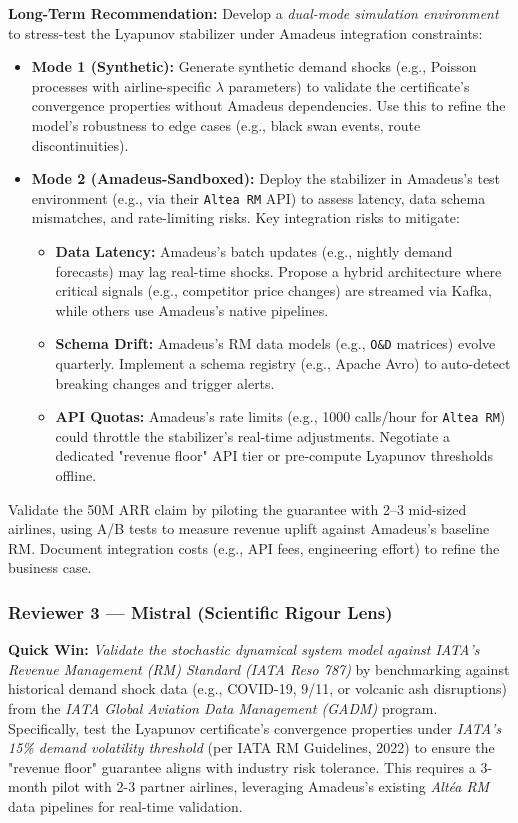 \documentclass[11pt,a4paper]{article}
\begin{document}
\textbf{Long-Term Recommendation:}
Develop a \textit{dual-mode simulation environment} to stress-test the Lyapunov stabilizer under Amadeus integration constraints:
\begin{itemize}
    \item \textbf{Mode 1 (Synthetic):} Generate synthetic demand shocks (e.g., Poisson processes with airline-specific $\lambda$ parameters) to validate the certificate's convergence properties without Amadeus dependencies. Use this to refine the model's robustness to edge cases (e.g., black swan events, route discontinuities).
    \item \textbf{Mode 2 (Amadeus-Sandboxed):} Deploy the stabilizer in Amadeus's test environment (e.g., via their \texttt{Altea RM} API) to assess latency, data schema mismatches, and rate-limiting risks. Key integration risks to mitigate:
    \begin{itemize}
        \item \textbf{Data Latency:} Amadeus's batch updates (e.g., nightly demand forecasts) may lag real-time shocks. Propose a hybrid architecture where critical signals (e.g., competitor price changes) are streamed via Kafka, while others use Amadeus's native pipelines.
        \item \textbf{Schema Drift:} Amadeus's RM data models (e.g., \texttt{O\&D} matrices) evolve quarterly. Implement a schema registry (e.g., Apache Avro) to auto-detect breaking changes and trigger alerts.
        \item \textbf{API Quotas:} Amadeus's rate limits (e.g., 1000 calls/hour for \texttt{Altea RM}) could throttle the stabilizer's real-time adjustments. Negotiate a dedicated "revenue floor" API tier or pre-compute Lyapunov thresholds offline.
    \end{itemize}
\end{itemize}
Validate the 50M ARR claim by piloting the guarantee with 2--3 mid-sized airlines, using A/B tests to measure revenue uplift against Amadeus's baseline RM. Document integration costs (e.g., API fees, engineering effort) to refine the business case.

\subsubsection*{Reviewer 3 — Mistral (Scientific Rigour Lens)}
\textbf{Quick Win:} \textit{Validate the stochastic dynamical system model against IATA's Revenue Management (RM) Standard (IATA Reso 787)} by benchmarking against historical demand shock data (e.g., COVID-19, 9/11, or volcanic ash disruptions) from the \textit{IATA Global Aviation Data Management (GADM)} program. Specifically, test the Lyapunov certificate's convergence properties under \textit{IATA's 15\% demand volatility threshold} (per IATA RM Guidelines, 2022) to ensure the "revenue floor" guarantee aligns with industry risk tolerance. This requires a 3-month pilot with 2-3 partner airlines, leveraging Amadeus's existing \textit{Altéa RM} data pipelines for real-time validation. \\
\end{document}
